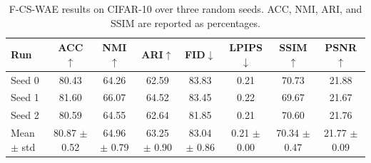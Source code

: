 \begin{table}[t]
\centering
\caption{F-CS-WAE results on CIFAR-10 over three random seeds. ACC, NMI, ARI, and SSIM are reported as percentages.}
\label{tab:f-cs-wae-cifar10-main}
\begin{tabular}{lccccccc}
\toprule
Run & ACC$\uparrow$ & NMI$\uparrow$ & ARI$\uparrow$ & FID$\downarrow$ & LPIPS$\downarrow$ & SSIM$\uparrow$ & PSNR$\uparrow$ \\
\midrule
Seed 0 & 80.43 & 64.26 & 62.59 & 83.83 & 0.21 & 70.73 & 21.88 \\
Seed 1 & 81.60 & 66.07 & 64.52 & 83.45 & 0.22 & 69.67 & 21.67 \\
Seed 2 & 80.59 & 64.55 & 62.64 & 81.85 & 0.21 & 70.60 & 21.76 \\
\midrule
Mean $\pm$ std & 80.87 $\pm$ 0.52 & 64.96 $\pm$ 0.79 & 63.25 $\pm$ 0.90 & 83.04 $\pm$ 0.86 & 0.21 $\pm$ 0.00 & 70.34 $\pm$ 0.47 & 21.77 $\pm$ 0.09 \\
\bottomrule
\end{tabular}
\end{table}